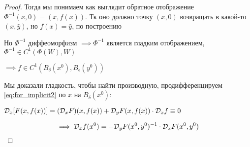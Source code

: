 \begin{proof}
    Тогда мы понимаем как выглядит обратное отображение $\Phi^{-1}(x, 0) = (x, f(x))$. Тк оно должно точку $(x, 0)$ возвращать в какой-то $(x, \hat{y})$, но $f(x) = \hat{y}$, по построению

    Но $\Phi^{-1}$ диффеоморфизм $\implies \Phi^{-1}$ является гладким отображением, $\Phi^{-1} \in C^1(\Phi(W), W)$

    $\implies f \in C^1(B_\delta(x^0), B_\epsilon(y^0))$

    Мы доказали гладкость, чтобы найти производную, продифференцируем \eqref{eq:for_implicit2} по $x$ на $B_\delta(x^0)$:

    $\mathcal{D}_x[F(x, f(x))] = (\mathcal{D}_x F)(x, f(x)) + \mathcal{D}_y F(x, f(x)) \cdot \mathcal{D}_x f \equiv 0$ 
    

    $$\implies \mathcal{D}_x f(x^0) = -\mathcal{D}_y F(x^0, y^0)^{-1}\cdot \mathcal{D}_x F(x^0, y^0)$$
\end{proof}